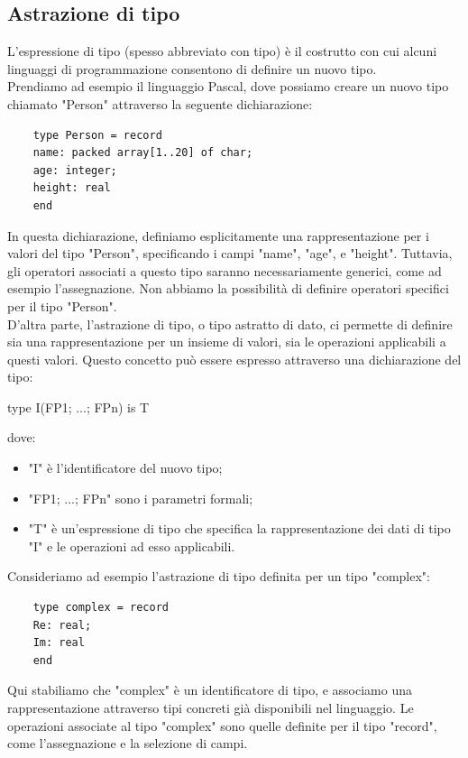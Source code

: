 \documentclass{article}
\begin{document}
	\subsection{Astrazione di tipo}
	L'espressione di tipo (spesso abbreviato con tipo) è il costrutto con cui alcuni linguaggi di programmazione consentono di definire un nuovo tipo.
	\\Prendiamo ad esempio il linguaggio Pascal, dove possiamo creare un nuovo tipo chiamato "Person" attraverso la seguente dichiarazione:
	\begin{verbatim}
	type Person = record
	name: packed array[1..20] of char;
	age: integer;
	height: real
	end
	\end{verbatim}
	In questa dichiarazione, definiamo esplicitamente una rappresentazione per i valori del tipo "Person", specificando i campi "name", "age", e "height". Tuttavia, gli operatori associati a questo tipo saranno necessariamente generici, come ad esempio l'assegnazione. Non abbiamo la possibilità di definire operatori specifici per il tipo "Person".
	\vspace{\baselineskip} \\
	D'altra parte, l'astrazione di tipo, o tipo astratto di dato, ci permette di definire sia una rappresentazione per un insieme di valori, sia le operazioni applicabili a questi valori. Questo concetto può essere espresso attraverso una dichiarazione del tipo:
	\begin{center}
	type I(FP1; ...; FPn) is T
	\end{center}
	dove:
	\begin{itemize}
		\item "I" è l'identificatore del nuovo tipo;
		\item "FP1; ...; FPn" sono i parametri formali;
		\item "T" è un'espressione di tipo che specifica la rappresentazione dei dati di tipo "I" e le operazioni ad esso applicabili.
	\end{itemize}
	Consideriamo ad esempio l'astrazione di tipo definita per un tipo "complex":
	\begin{verbatim}
	type complex = record
	Re: real;
	Im: real
	end
	\end{verbatim}
	Qui stabiliamo che "complex" è un identificatore di tipo, e associamo una rappresentazione attraverso tipi concreti già disponibili nel linguaggio. Le operazioni associate al tipo "complex" sono quelle definite per il tipo "record", come l'assegnazione e la selezione di campi.
	\vspace{\baselineskip} \\
\end{document}
